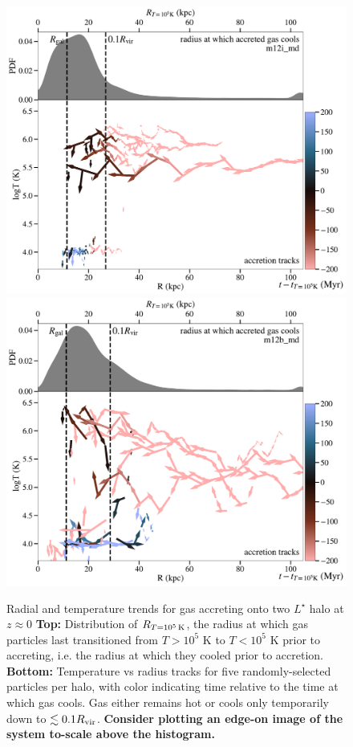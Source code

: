 \documentclass[fleqn,usenatbib]{mnras}
\newcommand{\Rcon}{R_{T=10^5\,{\rm K}}}
\begin{document}
\begin{figure}
    \centering
    \includegraphics[width=\columnwidth]{figures/tracks/tracks_m12i_md.pdf}
    \includegraphics[width=\columnwidth]{figures/tracks/tracks_m12b_md.pdf}
    \caption{
    Radial and temperature trends for gas accreting onto two $L^\star$ halo at $z\approx0$
    \textbf{Top:} Distribution of $\Rcon$, the radius at which gas particles last transitioned from $T > 10^5$ K to $T < 10^5$ K prior to accreting, i.e. the radius at which they cooled prior to accretion.
    \textbf{Bottom:} Temperature vs radius tracks for five randomly-selected particles per halo, with color indicating time relative to the time at which gas cools.
    Gas either remains hot or cools only temporarily down to $\lesssim 0.1 R_{\rm vir}$.
    \textbf{
    Consider plotting an edge-on image of the system to-scale above the histogram.
    }
    }
    \label{f: T vs R}
\end{figure}
\end{document}
